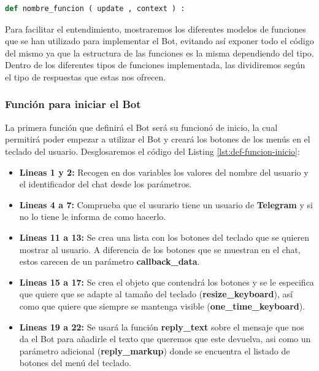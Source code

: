 
\begin{lstlisting}[language=Python, caption={Definición de un función usada por los handler.}, label={lst:def-funcion}]
def nombre_funcion ( update , context ) :
\end{lstlisting}

Para facilitar el entendimiento, mostraremos los diferentes modelos de funciones que se han utilizado para implementar el Bot, evitando así exponer todo el código del mismo ya que la estructura de las funciones es la misma dependiendo del tipo. Dentro de los diferentes tipos de funciones implementada, las dividiremos según el tipo de respuestas que estas nos ofrecen.

\subsubsection{Función para iniciar el Bot}

La primera función que definirá el Bot será su funcionó de inicio, la cual permitirá poder empezar a utilizar el Bot y creará los botones de los menús en el teclado del usuario. Desglosaremos el código del Listing \ref{lst:def-funcion-inicio}:

\begin{itemize}
	\item \textbf{Lineas 1 y 2:} Recogen en dos variables los valores del nombre del usuario y el identificador del chat desde los parámetros.
	\item \textbf{Lineas 4 a 7:} Comprueba que el usurario tiene un usuario de \textbf{Telegram} y si no lo tiene le informa de como hacerlo.
	\item \textbf{Lineas 11 a 13:} Se crea una lista con los botones del teclado que se quieren mostrar al usuario. A diferencia de los botones que se muestran en el chat, estos carecen de un parámetro \textbf{callback\_data}.
	\item \textbf{Lineas 15 a 17:} Se crea el objeto que contendrá los botones y se le especifica que quiere que se adapte al tamaño del teclado (\textbf{resize\_keyboard}), así como que quiere que siempre se mantenga visible (\textbf{one\_time\_keyboard}).
	\item \textbf{Lineas 19 a 22:} Se usará la función \textbf{reply\_text} sobre el mensaje que nos da el Bot para añadirle el texto que queremos que este devuelva, asi como un parámetro adicional (\textbf{reply\_markup}) donde se encuentra el listado de botones del menú del teclado.
\end{itemize}

